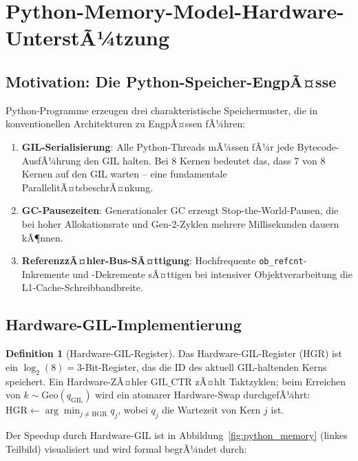 ﻿\documentclass[a4paper,12pt]{scrreprt}
\theoremstyle{definition}
\newtheorem{definition}{Definition}[section]
\newcommand{\Geo}{\mathrm{Geo}}
\begin{document}
	\section{Python-Memory-Model-Hardware-UnterstÃ¼tzung}
	\label{sec:pma}
	
	\subsection{Motivation: Die Python-Speicher-EngpÃ¤sse}
	
	Python-Programme erzeugen drei charakteristische Speichermuster, die
	in konventionellen Architekturen zu EngpÃ¤ssen fÃ¼hren:
	
	\begin{enumerate}[noitemsep]
		\item \textbf{GIL-Serialisierung}: Alle Python-Threads mÃ¼ssen fÃ¼r jede
		Bytecode-AusfÃ¼hrung den GIL halten. Bei 8 Kernen bedeutet das,
		dass 7 von 8 Kernen auf den GIL warten -- eine fundamentale
		ParallelitÃ¤tsbeschrÃ¤nkung.
		\item \textbf{GC-Pausezeiten}: Generationaler GC erzeugt Stop-the-World-Pausen,
		die bei hoher Allokationsrate und Gen-2-Zyklen mehrere Millisekunden
		dauern kÃ¶nnen.
		\item \textbf{ReferenzzÃ¤hler-Bus-SÃ¤ttigung}: Hochfrequente
		\texttt{ob\_refcnt}-Inkremente und -Dekremente sÃ¤ttigen bei
		intensiver Objektverarbeitung die L1-Cache-Schreibbandbrei\-te.
	\end{enumerate}
	
	\subsection{Hardware-GIL-Implementierung}
	
	\begin{definition}[Hardware-GIL-Register]
		\label{def:hw_gil}
		Das Hardware-GIL-Register (HGR) ist ein $\log_2(8) = 3$-Bit-Register,
		das die ID des aktuell GIL-haltenden Kerns speichert. Ein Hardware-ZÃ¤hler
		$\mathrm{GIL\_CTR}$ zÃ¤hlt Taktzyklen; beim Erreichen von
		$k \sim \Geo(q_{\mathrm{GIL}})$ wird ein atomarer Hardware-Swap
		durchgefÃ¼hrt: $\mathrm{HGR} \leftarrow \arg\min_{j \ne \mathrm{HGR}} q_j$,
		wobei $q_j$ die Wartezeit von Kern $j$ ist.
	\end{definition}
	
	Der Speedup durch Hardware-GIL ist in Abbildung~\ref{fig:python_memory}
	(linkes Teilbild) visualisiert und wird formal begrÃ¼ndet durch:
	
\end{document}
